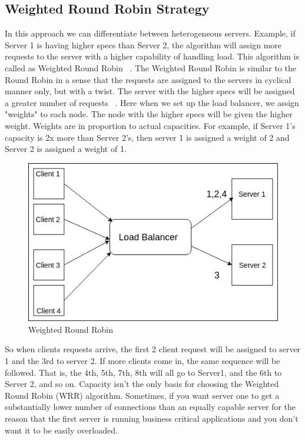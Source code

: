 \documentclass[letterpaper, 10 pt, conference]{IEEEtran}
\begin{document}
\subsection{Weighted Round Robin Strategy}

In this approach we can differentiate between heterogeneous servers. Example, if Server 1 is having higher specs than Server 2, the algorithm  will assign more requests to the server with a higher capability of handling load. This algorithm is called as Weighted Round Robin ~\cite{c2}. 
The Weighted Round Robin is similar to the Round Robin in a sense that the requests are assigned to the servers in cyclical manner only, but with a twist. The server with the higher specs will be assigned a greater number of requests ~\cite{c5}. Here when we set up the load balancer, we assign "weights" to each node. The node with the higher specs will be given the higher weight. Weights are in  proportion to actual capacities. For example, if Server 1's capacity is 2x more than Server 2's, then server 1 is assigned a weight of 2 and Server 2 is assigned a weight of 1.

\begin{figure}[ht!]
\centering
\includegraphics[width=\linewidth]{WRR.jpg}
\caption{Weighted Round Robin \label{fig:4}}
\end{figure}

So when clients requests arrive, the first 2 client request will be assigned to server 1 and the 3rd to server 2. If more clients come in, the same sequence will be followed. That is, the 4th, 5th, 7th, 8th will all go to Server1, and the 6th to Server 2, and so on. 
Capacity isn't the only basis for choosing the Weighted Round Robin (WRR) algorithm. Sometimes, if you want server one to get a substantially lower number of connections than an equally capable server for the reason that the first server is running business critical applications and you don't want it to be easily overloaded. 
\end{document}
